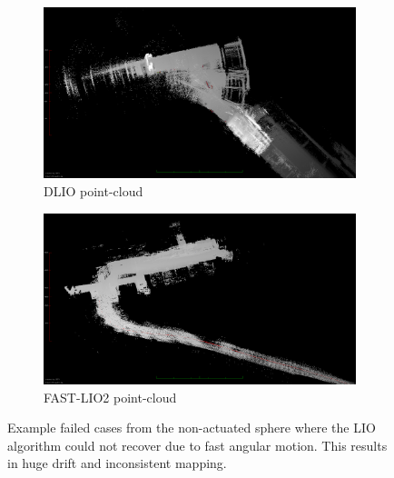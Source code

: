 \documentclass[english, bachelor, utf8]{base/thesis_telematics}
\begin{document}
\begin{figure}[h]
\centering
\begin{subfigure}{0.49\columnwidth}
    \centering
    \includegraphics[width=\textwidth]{pics/drifts_bending/dlio_drift.png}
    \caption{DLIO point-cloud}\label{fig:dlio_drift}
\end{subfigure}
\begin{subfigure}{0.49\columnwidth}
    \centering
    \includegraphics[width=\textwidth]{pics/drifts_bending/lio_drifts.png}
    \caption{FAST-LIO2 point-cloud}\label{fig:lio_drift}
\end{subfigure}
\caption{Example failed cases from the non-actuated sphere where the LIO algorithm could not recover due to fast angular motion.
This results in huge drift and inconsistent mapping.}\vspace{-3mm}
\label{fig:drift}
\end{figure}
\end{document}
